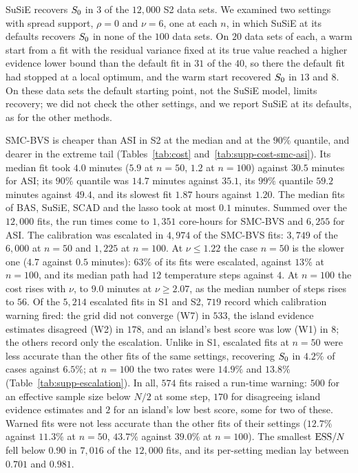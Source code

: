 SuSiE recovers $S_0$ in $3$ of the $12{,}000$ S2 data sets. We examined two settings with spread support, $\rho=0$
and $\nu=6$, one at each $n$, in which SuSiE at its defaults recovers $S_0$ in none of the $100$ data sets. On $20$ data
sets of each, a warm start from a fit with the residual variance fixed at its true value reached a higher evidence
lower bound than the default fit in $31$ of the $40$, so there the default fit had stopped at a local optimum, and the
warm start recovered $S_0$ in $13$ and $8$. On these data sets the default starting point, not the SuSiE model, limits
recovery; we did not check the other settings, and we report SuSiE at its defaults, as for the other methods.

SMC-BVS is cheaper than ASI in S2 at the median and at the $90\%$ quantile, and dearer in the extreme tail
(Tables~\ref{tab:cost} and~\ref{tab:supp-cost-smc-asi}). Its median fit took $4.0$ minutes ($5.9$ at $n=50$, $1.2$ at
$n=100$) against $30.5$ minutes for ASI; its $90\%$ quantile was $14.7$ minutes against $35.1$, its $99\%$ quantile
$59.2$ minutes against $49.4$, and its slowest fit $1.87$ hours against $1.20$. The median fits of BAS, SuSiE, SCAD and
the lasso took at most $0.1$ minutes. Summed over the $12{,}000$ fits, the run times come to
$1{,}351$ core-hours for SMC-BVS and $6{,}255$ for ASI. The
calibration was escalated in $4{,}974$ of the SMC-BVS fits: $3{,}749$ of the $6{,}000$ at $n=50$ and $1{,}225$ at
$n=100$. At $\nu\le1.22$ the case $n=50$ is the slower one ($4.7$ against $0.5$ minutes): $63\%$ of its fits
were escalated, against $13\%$ at $n=100$, and its median path had $12$ temperature steps against $4$. At $n=100$ the
cost rises with $\nu$, to $9.0$ minutes at $\nu\ge2.07$, as the median number of steps rises to $56$. Of the $5{,}214$ escalated fits in S1 and S2, $719$ record which calibration warning fired: the grid
did not converge (W7) in $533$, the island evidence estimates disagreed (W2) in $178$, and an island's best score was
low (W1) in $8$; the others record only the escalation. Unlike in S1, escalated
fits at $n=50$ were less accurate than the other fits of the same settings, recovering $S_0$ in $4.2\%$ of cases against
$6.5\%$; at $n=100$ the two rates were $14.9\%$ and $13.8\%$ (Table~\ref{tab:supp-escalation}). In all, $574$ fits raised a run-time warning: $500$ for an
effective sample size below $N/2$ at some step, $170$ for disagreeing island evidence estimates and $2$ for an
island's low best score, some for two of these. Warned fits were not less accurate than the other fits of their
settings ($12.7\%$ against $11.3\%$ at $n=50$, $43.7\%$ against $39.0\%$ at $n=100$). The smallest $\mathrm{ESS}/N$ fell below
$0.90$ in $7{,}016$ of the $12{,}000$ fits, and its per-setting median lay between $0.701$ and $0.981$.
